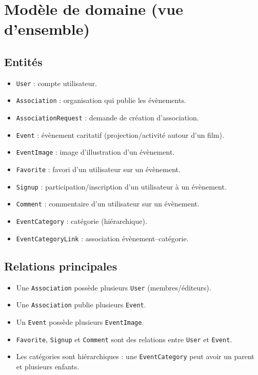 \documentclass[11pt,a4paper]{article}
\begin{document}
\section{Modèle de domaine (vue d’ensemble)}
\subsection{Entités}
\begin{itemize}
  \item \texttt{User} : compte utilisateur.
  \item \texttt{Association} : organisation qui publie les évènements.
  \item \texttt{AssociationRequest} : demande de création d’association.
  \item \texttt{Event} : évènement caritatif (projection/activité autour d’un film).
  \item \texttt{EventImage} : image d’illustration d’un évènement.
  \item \texttt{Favorite} : favori d’un utilisateur sur un évènement.
  \item \texttt{Signup} : participation/inscription d’un utilisateur à un évènement.
  \item \texttt{Comment} : commentaire d’un utilisateur sur un évènement.
  \item \texttt{EventCategory} : catégorie (hiérarchique).
  \item \texttt{EventCategoryLink} : association évènement--catégorie.
\end{itemize}

\subsection{Relations principales}
\begin{itemize}
  \item Une \texttt{Association} possède plusieurs \texttt{User} (membres/éditeurs).
  \item Une \texttt{Association} publie plusieurs \texttt{Event}.
  \item Un \texttt{Event} possède plusieurs \texttt{EventImage}.
  \item \texttt{Favorite}, \texttt{Signup} et \texttt{Comment} sont des relations entre \texttt{User} et \texttt{Event}.
  \item Les catégories sont hiérarchiques : une \texttt{EventCategory} peut avoir un parent et plusieurs enfants.
\end{itemize}
\end{document}

